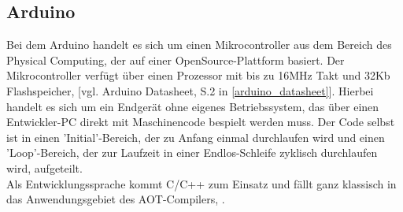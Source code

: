 \subsection{Arduino}
Bei dem Arduino handelt es sich um einen Mikrocontroller aus dem Bereich des Physical Computing, der auf einer OpenSource-Plattform basiert. Der Mikrocontroller verfügt über einen Prozessor mit bis zu 16MHz Takt und 32Kb Flashspeicher, [vgl. Arduino Datasheet, S.2 in \autoref{arduino_datasheet}]. Hierbei handelt es sich um ein Endgerät ohne eigenes Betriebssystem, das über einen Entwickler-PC direkt mit Maschinencode bespielt werden muss. Der Code selbst ist in einen 'Initial'-Bereich, der zu Anfang einmal durchlaufen wird und einen 'Loop'-Bereich, der zur Laufzeit in einer Endlos-Schleife zyklisch durchlaufen wird, aufgeteilt.\\
Als Entwicklungssprache kommt C/C++ zum Einsatz und fällt ganz klassisch in das Anwendungsgebiet des \ac{AOT}-Compilers, \cite[vgl. Louis 2016, S.1]{louis_2016}.